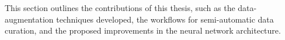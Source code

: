 

This section outlines the contributions of this thesis, such as the data-augmentation techniques developed, the workflows for semi-automatic data curation, and the proposed improvements in the neural network architecture.
